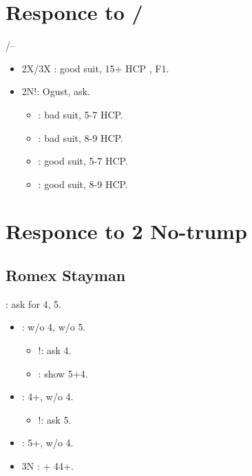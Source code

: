 \documentclass[12pt,twoside,a5paper]{report}%
\begin{document}
\chapter*{Responce to /\sp{}}
	/-- \\
		\begin{itemize}
		\renewcommand{\labelitemi}{}	
		\item 2X/3X : good suit, 15+ HCP , F1.
		\item 2N!: Ogust, ask.
			\begin{itemize}
			\renewcommand{\labelitemi}{--}
				\item {} : bad suit, 5-7 HCP.
				\item {} : bad suit, 8-9 HCP.
				\item {} : good suit, 5-7 HCP.
				\item {} : good suit, 8-9 HCP.
			\end{itemize}
		\end{itemize}

\chapter*{Responce to 2 No-trump}
	
	\section*{Romex Stayman}
		 : ask for 4\he{}, 5\sp{}.
		\begin{itemize}
		\renewcommand{\labelitemi}{--}
			\item {} : w/o 4\he{}, w/o 5\sp{}.
			\begin{itemize}
			\renewcommand{\labelitemi}{--}
				\item {}!: ask 4\sp{}.
				\item {} : show 5\sp{}+4\he{}.
			\end{itemize}
			\item {} : 4+\he{}, w/o 4\sp{}.
			\begin{itemize}
			\renewcommand{\labelitemi}{--}
				\item {}!: ask 5\he{}.
			\end{itemize}
			\item {} : 5+\sp{}, w/o 4\he{}.
			\item 3N : \he{}+\sp{} 44+.
		\end{itemize}
		
\end{document}
